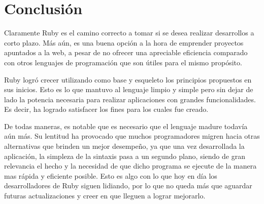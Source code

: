 \documentclass{article}
\begin{document}
\bigskip




\section{Conclusión}

	Claramente Ruby es el camino correcto a tomar si se desea realizar desarrollos a corto plazo. Más aún, es una buena opción a la hora de emprender proyectos apuntados a la web, a pesar de no ofrecer una apreciable eficiencia comparado con otros lenguajes de programación que son útiles para el mismo propósito.
	\par
	Ruby logró crecer utilizando como base y esqueleto los principios propuestos en sus inicios. Esto es lo que mantuvo al lenguaje limpio y simple pero sin dejar de lado la potencia necesaria para realizar aplicaciones con grandes funcionalidades. Es decir, ha logrado satisfacer los fines para los cuales fue creado.
	\par
	De todas maneras, es notable que es necesario que el lenguaje madure todavía aún más. Su lentitud ha provocado que muchos programadores migren hacia otras alternativas que brinden un mejor desempeño, ya que una vez desarrollada la aplicación, la simpleza de la sintaxis pasa a un segundo plano, siendo de gran relevancia el hecho y la necesidad de que dicho programa se ejecute de la manera mas rápida y eficiente posible. Esto es algo con lo que hoy en día los desarrolladores de Ruby siguen lidiando, por lo que no queda más que aguardar futuras actualizaciones y creer en que lleguen a lograr mejorarlo.
\end{document}
